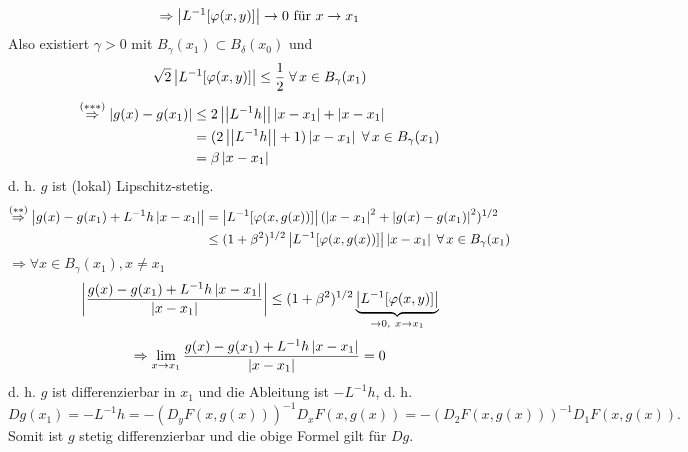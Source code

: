 \documentclass[../ana2.tex]{subfiles}
\begin{document}
\begin{bew}
    \[ \Rightarrow \left| L^{-1}[\varphi(x,y)] \right| \rightarrow 0 \text{ für } x \rightarrow x_1 \]
    Also existiert \( \gamma > 0 \) mit \( B_\gamma(x_1) \subset 
    B_\delta(x_0) \) und 
    \[ \sqrt{2} \abs{L^{-1}[\varphi(x,y)]} \leq \frac{1}{2} 
    \;\forall x \in B_\gamma(x_1) \]
    \begin{align*}
        \overset{(***)}{\Rightarrow} 
        \abs{ g(x) - g(x_1) } &\leq 2 \norm{ L^{-1}h }\abs{x - x_1} 
        + \abs{x - x_1} \\
        &= (2 \norm{L^{-1} h} + 1)\abs{x-x_1} \;\forall x \in B_\gamma(x_1) \\
        &= \beta\abs{x - x_1}
    \end{align*}
    d. h. \(g\) ist (lokal) Lipschitz-stetig.
    \begin{align*}
        \overset{(**)}{\Rightarrow} \abs{ g(x) - g(x_1) + L^{-1}h \abs{x - x_1} } 
        &= \abs{ L^{-1}[\varphi(x,g(x))] } (\abs{ x - x_1 }^2 + \abs{ g(x) - g(x_1) }^2)^{1/2} \\
        &\leq (1 + \beta^2)^{1/2} \abs{ L^{-1}[\varphi(x, g(x))] } \abs{x - x_1} 
        \;\forall x \in B_\gamma(x_1)
    \end{align*}
    \( \Rightarrow \forall x \in B_\gamma(x_1), x \neq x_1 \)
    \[ \left|\frac{g(x)-g(x_1)+ L^{-1}h\left|x-x_1\right|}{\left|x-x_1\right|}\right|  \leq (1+\beta^2)^{1/2} 
    \underbrace{\left|L^{-1}[\varphi(x,y)]\right| }_{\rightarrow 0,\ x \rightarrow x_1} \]
    \[ \Rightarrow \lim\limits_{x\rightarrow{}x_1} \frac{g(x)-g(x_1)+L^{-1}h\left|x-x_1\right|}{\left|x-x_1\right|} = 0 \]
    d. h. \(g\) ist differenzierbar in \(x_1\) und die Ableitung 
    ist \( -L^{-1}h \), d. h. 
    \[ Dg(x_1) = -L^{-1}h = -(D_y F(x,g(x)) )^{-1} D_x F(x,g(x))
    = -(D_2 F(x,g(x)))^{-1}D_1 F(x, g(x)). \]
    Somit ist \(g\) stetig differenzierbar und die obige Formel gilt für \(Dg\).
\end{bew}
\end{document}
